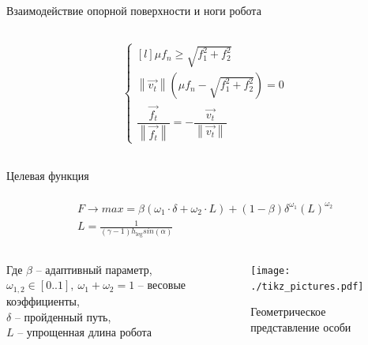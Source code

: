 \begin{frame}[t]{Взаимодействие опорной поверхности и ноги робота}
\begin{columns}[T,onlytextwidth]
\begin{column}{0.35\textwidth}
\begin{align}
                \left\{\begin{matrix*}[l]
                           \mu f_n \geqslant \sqrt{f_1^2 + f_2^2}\\
                           \left\lVert \vec{v_t}\right\rVert (\mu f_n - \sqrt{f_1^2 + f_2^2}) = 0\\
                           \dfrac{\vec{f_t}}{\left\lVert \vec{f_t}\right\rVert } = - \dfrac{\vec{v_t}}{\left\lVert \vec{v_t}\right\rVert }
                       \end{matrix*}\right.
            \end{align}
        \end{column}
    \end{columns}
\end{frame}


\begin{frame}[t]{Целевая функция}
    \framesubtitle{}
    \begin{eqnarray}
        F \rightarrow max = \beta \left( {\omega}_{1} \cdot \delta + {\omega}_{2} \cdot L\right) + (1 - \beta) {\delta}^{{\omega}_{1}} {\left( L\right)}^{{\omega}_{2}} \\
        L = \frac{1}{(\gamma - 1) h_{\text{leg}}sin(\alpha)}
    \end{eqnarray}
    \begin{columns}[T,onlytextwidth]
        \begin{column}{0.48\textwidth}
            Где
            $\beta$ -- адаптивный параметр, \\ 
            ${\omega}_{1,2} \in  [ 0..1 ],\ \omega_1 + \omega_2 = 1 $ -- весовые коэффициенты, \\
            $\delta$ -- пройденный путь, \\
            $L$ -- упрощенная длина робота

        \end{column}
        \begin{column}{0.50\textwidth}
            \begin{figure}[H]
                \centering
                \centering\texttt{[image: ./tikz\_pictures.pdf]}
                \caption*{Геометрическое представление особи}
            \end{figure}
        \end{column}
    \end{columns}
\end{frame}

